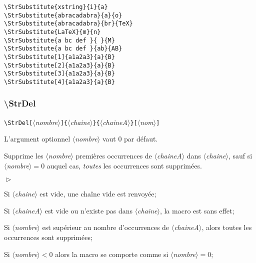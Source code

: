 \documentclass[a4paper,10pt]{article}
\newcommand\argu[1]{$\langle$\textit{#1}$\rangle$}
\newcommand\ARGU[1]{\texttt{\color{black}\{}\argu{#1}\texttt{\color{black}\}}}
\newcommand\arguC[1]{\texttt{\color{black}[}\argu{#1}\texttt{\color{black}]}}
\newenvironment{Conditions}[1][1cm]%
{\begin{list}%
	{$\vartriangleright$}%
	{\setlength{\leftmargin}{#1}
	 \setlength{\itemsep}{0pt}
	 \setlength{\parsep}{0pt}
	 \setlength{\topsep}{2ptplus3ptminus2pt}
	}}%
{\end{list}}
\newcommand\styleexemple{\small\vskip4pt}
\newcommand\verbinline{\lstinline[basicstyle=\normalsize\ttfamily]}
\begin{document}
\begin{minipage}[t]{0.65\linewidth}
\begin{lstlisting}
\StrSubstitute{xstring}{i}{a}
\StrSubstitute{abracadabra}{a}{o}
\StrSubstitute{abracadabra}{br}{TeX}
\StrSubstitute{LaTeX}{m}{n}
\StrSubstitute{a bc def }{ }{M}
\StrSubstitute{a bc def }{ab}{AB}
\StrSubstitute[1]{a1a2a3}{a}{B}
\StrSubstitute[2]{a1a2a3}{a}{B}
\StrSubstitute[3]{a1a2a3}{a}{B}
\StrSubstitute[4]{a1a2a3}{a}{B}
\end{lstlisting}%
\end{minipage}\hfill
\begin{minipage}[t]{0.35\linewidth}
	\styleexemple
	\par
	\par
	\par
	\par
	\par
	\par
	\par
	\par
	\par
\end{minipage}%

\subsubsection{\ttfamily\textbackslash StrDel}
\verbinline|\StrDel|\arguC{nombre}\ARGU{chaine}\ARGU{chaineA}\arguC{nom}
\smallskip

L'argument optionnel \argu{nombre} vaut 0 par défaut.\par\nobreak\smallskip
Supprime les \argu{nombre} premières occurrences de \argu{chaineA} dans \argu{chaine}, sauf si \argu{nombre}${}=0$ auquel cas, \emph{toutes} les occurrences sont supprimées.\medskip

\begin{Conditions}
	\item Si \argu{chaine} est vide, une chaîne vide est renvoyée;
	\item Si \argu{chaineA} est vide ou n'existe pas dans \argu{chaine}, la macro est sans effet;
	\item Si \argu{nombre} est supérieur au nombre d'occurrences de \argu{chaineA}, alors toutes les occurrences sont supprimées;
	\item Si \argu{nombre}${}<0$ alors la macro se comporte comme si \argu{nombre}${}=0$;
\end{Conditions}
\end{document}
